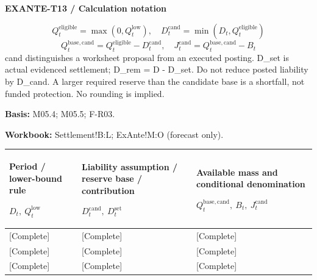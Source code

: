 \par\begingroup\sffamily\fontsize{8}{10}\selectfont\color{NEBGreen}\setlength{\parskip}{2pt}\setlength{\abovedisplayskip}{4pt}\setlength{\belowdisplayskip}{4pt}\setlength{\abovedisplayshortskip}{2pt}\setlength{\belowdisplayshortskip}{3pt}
\textbf{EXANTE-T13 / Calculation notation}\par
{\fontsize{9}{11}\selectfont\[ Q_t^{\mathrm{eligible}}=\max(0,Q_t^{\mathrm{low}}),\quad D_t^{\mathrm{cand}}=\min(D_t,Q_t^{\mathrm{eligible}}) \]}
{\fontsize{9}{11}\selectfont\[ Q_t^{\mathrm{base,cand}}=Q_t^{\mathrm{eligible}}-D_t^{\mathrm{cand}},\quad J_t^{\mathrm{cand}}=Q_t^{\mathrm{base,cand}}-B_t \]}
cand distinguishes a worksheet proposal from an executed posting. D\_set is actual evidenced settlement; D\_rem = D - D\_set. Do not reduce posted liability by D\_cand. A larger required reserve than the candidate base is a shortfall, not funded protection. No rounding is implied.\par
\textbf{Basis:} M05.4; M05.5; F-R03.\par
\textbf{Workbook:} Settlement!B:L; ExAnte!M:O (forecast only).\par\endgroup
{\sffamily\fontsize{8.3}{10.3}\selectfont\begin{longtable}{@{}P{54.83mm} P{54.83mm} P{54.83mm}@{}}
\toprule
\textbf{Period / lower-bound rule}\par {\normalfont\fontsize{8.2}{10}\selectfont $D_t,\ Q_t^{\mathrm{low}}$} & \textbf{Liability assumption / reserve base / contribution}\par {\normalfont\fontsize{8.2}{10}\selectfont $D_t^{\mathrm{cand}},\ D_t^{\mathrm{set}}$} & \textbf{Available mass and conditional denomination}\par {\normalfont\fontsize{8.2}{10}\selectfont $Q_t^{\mathrm{base,cand}},\ B_t,\ J_t^{\mathrm{cand}}$}\\\midrule\endhead
\rule{0pt}{8mm}[Complete] & [Complete] & [Complete]\\\hline
\rule{0pt}{8mm}[Complete] & [Complete] & [Complete]\\\hline
\rule{0pt}{8mm}[Complete] & [Complete] & [Complete]\\\hline
\end{longtable}}
